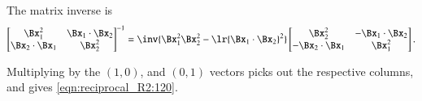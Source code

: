 {The matrix inverse is
\begin{dmath}\label{eqn:2dreciprocalMatrixCalculation:240}
{
\begin{bmatrix}
\Bx_1^2 & \Bx_1 \cdot \Bx_2 \\
\Bx_2 \cdot \Bx_1 & \Bx_2^2 \\
\end{bmatrix}
}^{-1}
=
\inv{ \Bx_1^2 \Bx_2^2 - \lr{\Bx_1 \cdot \Bx_2}^2 }
\begin{bmatrix}
\Bx_2^2 & -\Bx_1 \cdot \Bx_2 \\
-\Bx_2 \cdot \Bx_1 & \Bx_1^2 \\
\end{bmatrix}.
\end{dmath}

Multiplying by the \( (1,0) \), and \( (0,1) \) vectors picks out the respective columns, and gives \cref{eqn:reciprocal_R2:120}.
} %
